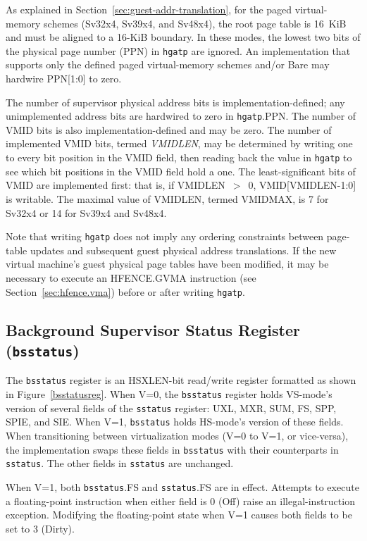 As explained in Section~\ref{sec:guest-addr-translation}, for the paged
virtual-memory schemes (Sv32x4, Sv39x4, and Sv48x4), the root page table is
16~KiB and must be aligned to a 16-KiB boundary.
In these modes, the lowest two bits of the physical page number (PPN) in
{\tt hgatp} are ignored.
An implementation that supports only the defined paged virtual-memory schemes
and/or Bare may hardwire PPN[1:0] to zero.

The number of supervisor physical address bits is implementation-defined; any
unimplemented address bits are hardwired to zero in {\tt hgatp}.PPN.
The number of VMID bits is also implementation-defined and may be zero.
The number of implemented VMID bits, termed {\mbox {\em VMIDLEN}}, may be
determined by writing one to every bit position in the VMID field, then reading
back the value in {\tt hgatp} to see which bit positions in the VMID field hold
a one.
The least-significant bits of VMID are implemented first:
that is, if VMIDLEN~$>$~0, VMID[VMIDLEN-1:0] is writable.
The maximal value of VMIDLEN, termed VMIDMAX, is 7 for Sv32x4 or 14 for Sv39x4
and Sv48x4.

Note that writing {\tt hgatp} does not imply any ordering constraints between
page-table updates and subsequent guest physical address translations.
If the new virtual machine's guest physical page tables have been modified, it
may be necessary to execute an HFENCE.GVMA instruction
(see Section~\ref{sec:hfence.vma}) before or after writing {\tt hgatp}.

\subsection{Background Supervisor Status Register ({\tt bsstatus})}

The {\tt bsstatus} register is an HSXLEN-bit read/write register formatted as
shown in Figure~\ref{bsstatusreg}.  When V=0, the {\tt bsstatus} register
holds VS-mode's version of several fields of the {\tt sstatus}
register: UXL, MXR, SUM, FS, SPP, SPIE, and SIE.  When V=1, {\tt bsstatus}
holds HS-mode's version of these fields.  When transitioning between
virtualization modes (V=0 to V=1, or vice-versa), the implementation swaps
these fields in {\tt bsstatus} with their counterparts in {\tt sstatus}.  The
other fields in {\tt sstatus} are unchanged.

When V=1, both {\tt bsstatus}.FS and {\tt sstatus}.FS are in effect.  Attempts
to execute a floating-point instruction when either field is 0 (Off) raise an
illegal-instruction exception.  Modifying the floating-point state when V=1
causes both fields to be set to 3 (Dirty).

